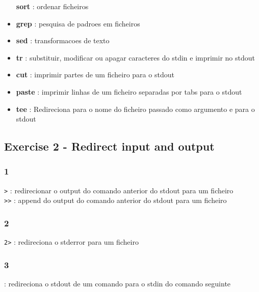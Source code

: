 \documentclass[]{article}
\begin{document}
\begin{itemize}
  \textbf{sort} : ordenar ficheiros\\
\item
  \textbf{grep} : pesquisa de padroes em ficheiros\\
\item
  \textbf{sed} : transformacoes de texto\\
\item
  \textbf{tr} : substituir, modificar ou apagar caracteres do stdin e
  imprimir no stdout\\
\item
  \textbf{cut} : imprimir partes de um ficheiro para o stdout\\
\item
  \textbf{paste} : imprimir linhas de um ficheiro separadas por tabs
  para o stdout\\
\item
  \textbf{tee} : Redireciona para o nome do ficheiro passado como
  argumento e para o stdout
\end{itemize}

\subsection{Exercise 2 - Redirect input and
output}\label{exercise-2---redirect-input-and-output}

\subsubsection{1}\label{section}

\texttt{\textgreater{}} : redirecionar o output do comando anterior do
stdout para um ficheiro\\\texttt{\textgreater{}\textgreater{}} : append
do output do comando anterior do stdout para um ficheiro

\subsubsection{2}\label{section-1}

\texttt{2\textgreater{}} : redireciona o stderror para um ficheiro

\subsubsection{3}\label{section-2}

\texttt{\textbar{}} : redireciona o stdout de um comando para o stdin do
comando seguinte
\end{document}
